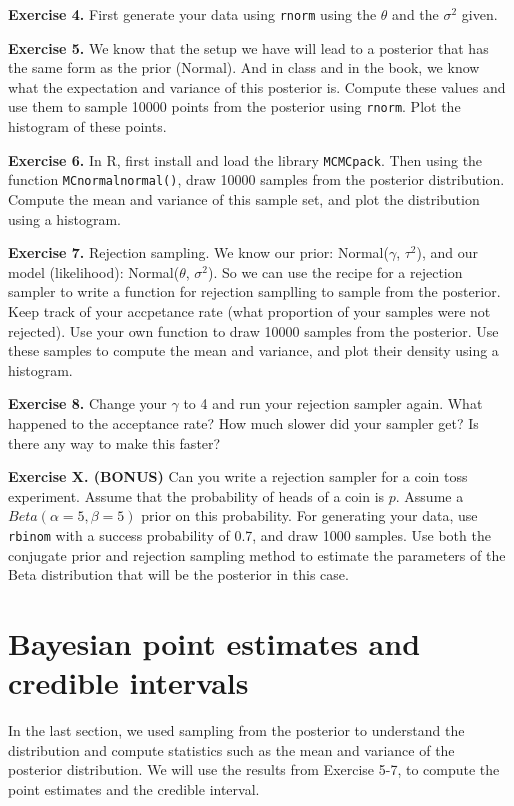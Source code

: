 \documentclass[
]{book}
\begin{document}
\textbf{Exercise 4.} First generate your data using \texttt{rnorm} using the \(\theta\) and the \(\sigma^2\) given.

\textbf{Exercise 5.} We know that the setup we have will lead to a posterior that has the same form as the prior (Normal). And in class and in the book, we know what the expectation and variance of this posterior is. Compute these values and use them to sample 10000 points from the posterior using \texttt{rnorm}. Plot the histogram of these points.

\textbf{Exercise 6.} In R, first install and load the library \texttt{MCMCpack}. Then using the function \texttt{MCnormalnormal()}, draw 10000 samples from the posterior distribution. Compute the mean and variance of this sample set, and plot the distribution using a histogram.

\textbf{Exercise 7.} Rejection sampling. We know our prior: Normal(\(\gamma\), \(\tau^2\)), and our model (likelihood): Normal(\(\theta\), \(\sigma^2\)). So we can use the recipe for a rejection sampler to write a function for rejection samplling to sample from the posterior. Keep track of your accpetance rate (what proportion of your samples were not rejected). Use your own function to draw 10000 samples from the posterior. Use these samples to compute the mean and variance, and plot their density using a histogram.

\textbf{Exercise 8.} Change your \(\gamma\) to 4 and run your rejection sampler again. What happened to the acceptance rate? How much slower did your sampler get? Is there any way to make this faster?

\textbf{Exercise X. (BONUS)} Can you write a rejection sampler for a coin toss experiment. Assume that the probability of heads of a coin is \(p\). Assume a \(Beta(\alpha=5, \beta=5)\) prior on this probability. For generating your data, use \texttt{rbinom} with a success probability of 0.7, and draw 1000 samples. Use both the conjugate prior and rejection sampling method to estimate the parameters of the Beta distribution that will be the posterior in this case.

\hypertarget{bayesian-point-estimates-and-credible-intervals}{%
\section{Bayesian point estimates and credible intervals}\label{bayesian-point-estimates-and-credible-intervals}}

In the last section, we used sampling from the posterior to understand the distribution and compute statistics such as the mean and variance of the posterior distribution. We will use the results from Exercise 5-7, to compute the point estimates and the credible interval.
\end{document}
